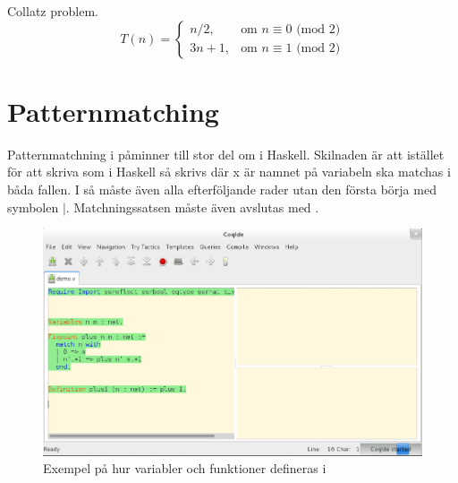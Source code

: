 Collatz problem.
\begin{equation}
T(n) = \left\{\begin{matrix} n/2, & \mbox{om }n\equiv0\mbox{ (mod 2)} \\ 3n+1,
                         & \mbox{om }n\equiv1\mbox{ (mod 2)} \end{matrix}\right.
\end{equation}

\section{Patternmatching}
Patternmatchning i \coq påminner till stor del om  i Haskell.
Skilnaden är att istället för att skriva  som i Haskell
så skrivs  där x är namnet på variabeln ska matchas i
båda fallen. I \coq så måste även alla efterföljande rader utan den första
börja med symbolen $|$. Matchningssatsen måste även avslutas med .

\begin{figure}[H]
  \centering
  \includegraphics[width=150mm]{images/Variables_and_Functions}
  \caption[Variabler och funktioner]
   {Exempel på hur variabler och funktioner defineras i \coq}
\end{figure}
